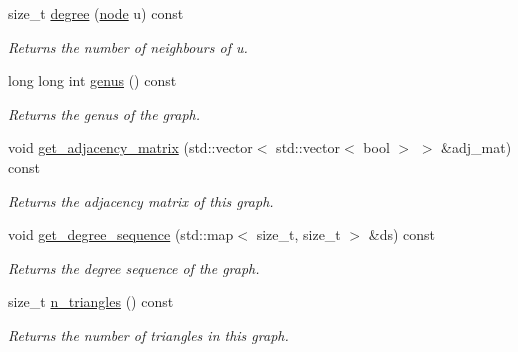\begin{DoxyCompactItemize}
size\+\_\+t \hyperlink{classlgraph_1_1xxgraph_a20ebc2927ee8fb8bb0a2c3b448d9ed78}{degree} (\hyperlink{namespacelgraph_a397169dd66adf725210a30fb7251773e}{node} u) const
\begin{DoxyCompactList}\small\item\em Returns the number of neighbours of u. \end{DoxyCompactList}\item 
long long int \hyperlink{classlgraph_1_1xxgraph_a5f48a91046766e3e0b71a3326f2b9153}{genus} () const
\begin{DoxyCompactList}\small\item\em Returns the genus of the graph. \end{DoxyCompactList}\item 
\mbox{\label{classlgraph_1_1xxgraph_a8108bac3649acfae39a45e6de2b339b6}} 
void \hyperlink{classlgraph_1_1xxgraph_a8108bac3649acfae39a45e6de2b339b6}{get\+\_\+adjacency\+\_\+matrix} (std\+::vector$<$ std\+::vector$<$ bool $>$ $>$ \&adj\+\_\+mat) const
\begin{DoxyCompactList}\small\item\em Returns the adjacency matrix of this graph. \end{DoxyCompactList}\item 
void \hyperlink{classlgraph_1_1xxgraph_a5b21b51f5f9c55c05c0e8e5bc836bf87}{get\+\_\+degree\+\_\+sequence} (std\+::map$<$ size\+\_\+t, size\+\_\+t $>$ \&ds) const
\begin{DoxyCompactList}\small\item\em Returns the degree sequence of the graph. \end{DoxyCompactList}\item 
size\+\_\+t \hyperlink{classlgraph_1_1xxgraph_a90a9b60caf18179576af61dc962b95e3}{n\+\_\+triangles} () const
\begin{DoxyCompactList}\small\item\em Returns the number of triangles in this graph. \end{DoxyCompactList}\end{DoxyCompactItemize}
